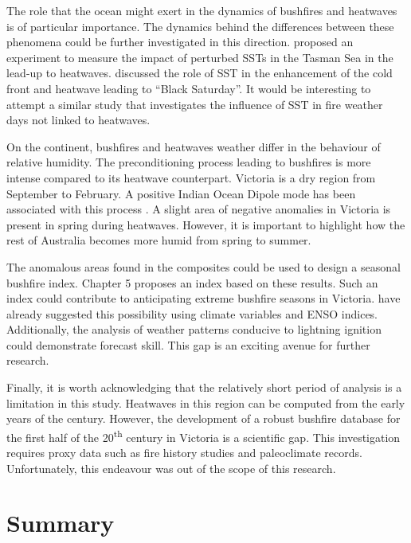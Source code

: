 The role that the ocean might exert in the dynamics of bushfires and
heatwaves is of particular importance. The dynamics behind the differences
between these phenomena could be further investigated in this direction.
\citet{Sadler2012} proposed an experiment to measure the impact of
perturbed SSTs in the Tasman Sea in the lead-up to heatwaves. \citet{Fiddes2015}
discussed the role of SST in the enhancement of the cold front and
heatwave leading to ``Black Saturday''. It would be interesting
to attempt a similar study that investigates the influence of SST
in fire weather days not linked to heatwaves. 

On the continent, bushfires and heatwaves weather differ in the behaviour
of relative humidity. The preconditioning process leading to bushfires
is more intense compared to its heatwave counterpart. Victoria is
a dry region from September to February. A positive Indian Ocean Dipole
mode has been associated with this process \citep{Cai2009}. A slight
area of negative anomalies in Victoria is present in spring during
heatwaves. However, it is important to highlight how the rest of Australia
becomes more humid from spring to summer. 

The anomalous areas found in the composites could be used to design
a seasonal bushfire index. Chapter 5 proposes an index based on these
results. Such an index could contribute to anticipating extreme bushfire
seasons in Victoria. \citet{Harris2013} have already suggested this
possibility using climate variables and ENSO indices. Additionally,
the analysis of weather patterns conducive to lightning ignition could
demonstrate forecast skill. This gap is an exciting avenue for
further research. 

Finally, it is worth acknowledging that the relatively short period
of analysis is a limitation in this study. Heatwaves in this region
can be computed from the early years of the century. However, the
development of a robust bushfire database for the first half of the
20\textsuperscript{th} century in Victoria is a scientific gap. This
investigation requires proxy data such as fire history studies and
paleoclimate records. Unfortunately, this endeavour was out of the
scope of this research.

\section{Summary}


